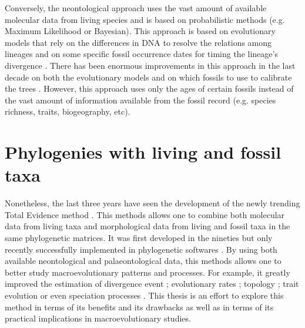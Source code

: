 Conversely, the neontological approach uses the vast amount of available molecular data from living species and is based on probabilistic methods (e.g. Maximum Likelihood or Bayesian).
This approach is based on evolutionary models that rely on the differences in DNA to resolve the relations among lineages and on some specific fossil occurrence dates for timing the lineage's divergence \citep[i.e. the molecular clock;][]{zuckerkandl1965}.
There has been enormous improvements in this approach in the last decade on both the evolutionary models \citep[e.g.][]{bapsta2013,stadlerdating2013,heaththe2013} and on which fossils to use to calibrate the trees \citep{Donoghue2007424,Parham01032012}.
However, this approach uses only the ages of certain fossils instead of the vast amount of information available from the fossil record (e.g. species richness, traits, biogeography, etc).


\section{Phylogenies with living and fossil taxa}
Nonetheless, the last three years have seen the development of the newly trending Total Evidence method \citep{ronquista2012,slaterphylogenetic2013,Wood01032013,schragocombining2013,beckancient2014,Arcila2015131,Dembo2015}.
This methods allows one to combine both molecular data from living taxa and morphological data from living and fossil taxa in the same phylogenetic matrices.
It was first developed in the nineties \citep{eernissetaxonomic1993} but only recently successfully implemented in phylogenetic softwares \citep{Ronquist2012mrbayes,BEAST2}.
By using both available neontological and palaeontological data, this methods allows one to better study macroevolutionary patterns and processes.
For example, it greatly improved the estimation of divergence event \citep[e.g.][]{ronquista2012}; evolutionary rates \citep[e.g.][]{beckancient2014}; topology \citep[e.g.][]{Dembo2015}; trait evolution \citep[e.g.][]{slaterphylogenetic2013} or even speciation processes \citep[e.g.][]{Wood01032013}.
This thesis is an effort to explore this method in terms of its benefits and its drawbacks as well as in terms of its practical implications in macroevolutionary studies.

